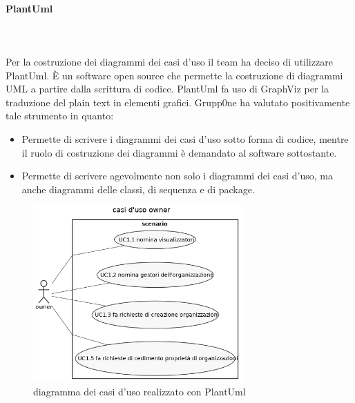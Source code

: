 \documentclass[../norme-di-progetto.tex]{subfiles}
\begin{document}
\paragraph{PlantUml}\mbox{}\\
\label{par:plantuml}
\\ Per la costruzione dei diagrammi dei casi d'uso il team ha deciso di utilizzare PlantUml. È un software open source che permette la costruzione di diagrammi UML a partire dalla scrittura di codice. PlantUml fa uso di GraphViz per la traduzione del plain text in elementi grafici. Grupp0ne ha valutato positivamente tale strumento in quanto:
\begin{itemize}
	\item Permette di scrivere i diagrammi dei casi d'uso sotto forma di codice, mentre il ruolo di costruzione dei diagrammi è demandato al software sottostante.
	\item Permette di scrivere agevolmente non solo i diagrammi dei casi d'uso, ma anche diagrammi delle classi, di sequenza e di package.
\end{itemize}
\begin{figure}[H]
\includegraphics[width=8cm]{components/owner_use_cases.png}
\centering
\caption{diagramma dei casi d'uso realizzato con PlantUml}
\end{figure}
\end{document}

